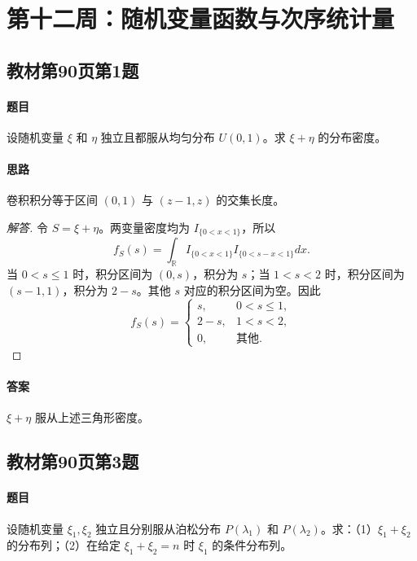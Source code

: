 \section{第十二周：随机变量函数与次序统计量}

\subsection{教材第90页第1题}\label{ex:w12-b90-1}
\paragraph{题目}
设随机变量 $\xi$ 和 $\eta$ 独立且都服从均匀分布 $U(0,1)$。求 $\xi+\eta$ 的分布密度。
\paragraph{思路}卷积积分等于区间 $(0,1)$ 与 $(z-1,z)$ 的交集长度。
\begin{proof}[解答]
令 $S=\xi+\eta$。两变量密度均为 $I_{\{0<x<1\}}$，所以
\[
f_S(s)=\int_{\mathbb R}I_{\{0<x<1\}}I_{\{0<s-x<1\}}dx.
\]
当 $0<s\leq1$ 时，积分区间为 $(0,s)$，积分为 $s$；当 $1<s<2$ 时，积分区间为 $(s-1,1)$，积分为 $2-s$。其他 $s$ 对应的积分区间为空。因此
\[
f_S(s)=\begin{cases}s,&0<s\leq1,\\2-s,&1<s<2,\\0,&\text{其他}.\end{cases}
\]
\end{proof}
\paragraph{答案}$\xi+\eta$ 服从上述三角形密度。

\subsection{教材第90页第3题}\label{ex:w12-b90-3}
\paragraph{题目}
设随机变量 $\xi_1,\xi_2$ 独立且分别服从泊松分布 $P(\lambda_1)$ 和 $P(\lambda_2)$。求：（1）$\xi_1+\xi_2$ 的分布列；（2）在给定 $\xi_1+\xi_2=n$ 时 $\xi_1$ 的条件分布列。
